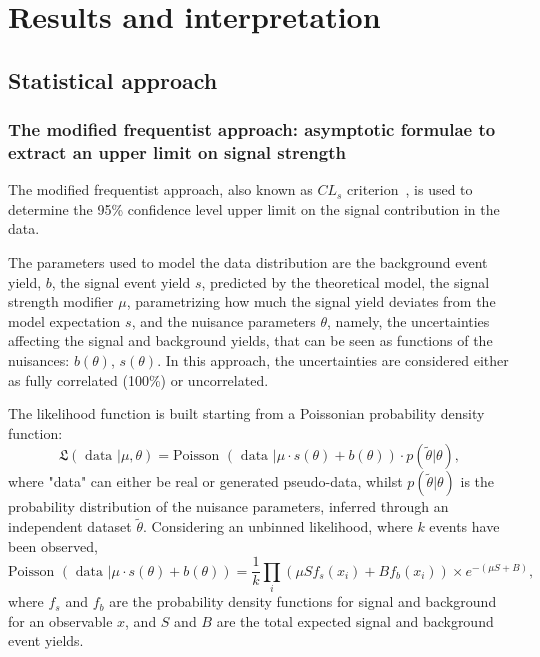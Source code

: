 \section{Results and interpretation}
\label{sec:results}

\subsection{Statistical approach}

\subsubsection{The modified frequentist approach: asymptotic formulae to extract an upper limit on signal strength}

The modified frequentist approach, also known as $CL_s$ criterion~\cite{bib:CLS1,bib:CLS2,bib:LHC-HCG-Report}, is used to determine the 95\% confidence level upper limit on the signal contribution in the data.%

\noindent The parameters used to model the data distribution are the background event yield, $b$, the signal event yield $s$, predicted by the theoretical model, the signal strength modifier $\mu$, parametrizing how much the signal yield deviates from the model expectation $s$, and the nuisance parameters $\theta$, namely, the uncertainties affecting the signal and background yields, that can be seen as functions of the nuisances: $b(\theta)$, $s(\theta)$. In this approach, the uncertainties are considered either as fully correlated (100\%) or uncorrelated.

\noindent The likelihood function is built starting from a Poissonian probability density function:
\begin{equation}
\mathfrak{L} (\text{ data }| \mu, \theta) = \text{Poisson } (\text{ data } | \mu \cdot s(\theta) + b(\theta)) \cdot p (\tilde{\theta}| \theta),
\label{eq:likelihood}
\end{equation}
where "data" can either be real or generated pseudo-data, whilst $p (\tilde{\theta}| \theta)$ is the probability distribution of the nuisance parameters, inferred through an independent dataset $\tilde{\theta}$. Considering an unbinned likelihood, where $k$ events have been observed,
\begin{equation}
\text{Poisson } (\text{ data } | \mu \cdot s(\theta) + b(\theta)) = \frac{1}{k} \prod_i \left( \mu S f_s(x_i) + B f_b (x_i) \right) \times e^{- (\mu S + B)},
\end{equation}
where $f_s$ and $f_b$ are the probability density functions for signal and background for an observable $x$, and $S$ and $B$ are the total expected signal and background event yields.

